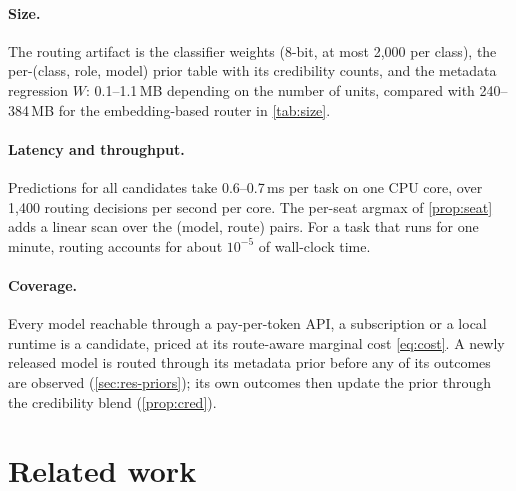 \documentclass[11pt,a4paper]{article}
\theoremstyle{definition}
\theoremstyle{remark}
\theoremstyle{definition}
\begin{document}
\paragraph{Size.} The routing artifact is the classifier weights (8-bit, at most 2{,}000 per class), the per-(class, role, model) prior table with its credibility counts, and the metadata regression $W$: 0.1--1.1\,MB depending on the number of units, compared with 240--384\,MB for the embedding-based router in \cref{tab:size}.

\paragraph{Latency and throughput.} Predictions for all candidates take 0.6--0.7\,ms per task on one CPU core, over 1{,}400 routing decisions per second per core. The per-seat argmax of \cref{prop:seat} adds a linear scan over the (model, route) pairs. For a task that runs for one minute, routing accounts for about $10^{-5}$ of wall-clock time.

\paragraph{Coverage.} Every model reachable through a pay-per-token API, a subscription or a local runtime is a candidate, priced at its route-aware marginal cost \eqref{eq:cost}. A newly released model is routed through its metadata prior before any of its outcomes are observed (\cref{sec:res-priors}); its own outcomes then update the prior through the credibility blend (\cref{prop:cred}).

\section{Related work}
\end{document}
